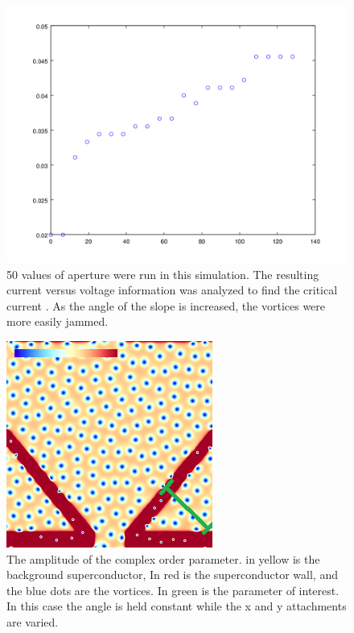 \begin{figure}[htbp]
\begin{center}
\includegraphics[scale=.50]{normalYscan.png}
\caption{ 50 values of aperture were run in this simulation. The resulting current versus voltage information was analyzed to find the critical current . As the angle of the slope is increased, the vortices were more easily jammed. }
\label{normalYscan}
\end{center}
\end{figure}


\begin{figure}[htbp]
\begin{center}
\includegraphics[scale=.50]{normalAngle.png}
\caption{ The amplitude of the complex order parameter. in yellow is the background superconductor, In red is the superconductor wall, and the blue dots are the vortices. In green is the parameter of interest. In this case the angle is held constant while the x and y attachments are varied. }
\label{normalAngle}
\end{center}
\end{figure}

